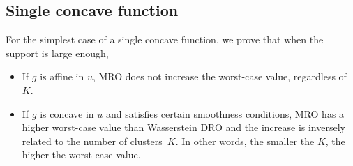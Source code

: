 \documentclass[12pt]{article}
\theoremstyle{thmstyleone}%
\theoremstyle{thmstyletwo}%
\theoremstyle{thmstylethree}%
\newcommand{\reviewChanges}{}
\begin{document}
\subsection{\reviewChanges{Single concave function}}
\label{sub:single-con}
For the simplest case of a single concave function, we prove that when the support is large enough,
\begin{itemize}
	\item If $g$ is affine in $u$, \gls{MRO} does not increase the worst-case value, regardless of $K$.
	\item If $g$ is concave in $u$ and satisfies certain smoothness conditions, \gls{MRO} has a higher worst-case value than Wasserstein \gls{DRO} and the increase is inversely related to the number of clusters~$K$. In other words, the smaller the $K$, the higher the worst-case value.
\end{itemize}
\end{document}
